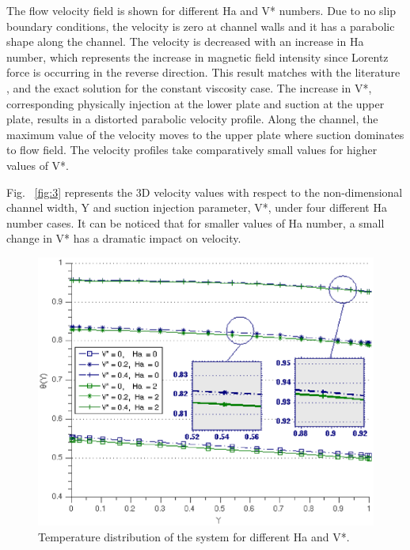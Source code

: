 The flow velocity field is shown for different Ha and V* numbers. Due to no slip boundary conditions, the velocity is zero at channel walls and it has a parabolic shape along the channel. The velocity is decreased with an increase in Ha number, which represents the increase in magnetic field intensity since Lorentz force is occurring in the reverse direction.  This result matches with the literature \cite{EegunjobiEntropy}, and the exact solution for the constant viscosity case. The increase in V*, corresponding physically injection at the lower plate and suction at the upper plate, results in a distorted parabolic velocity profile. Along the channel, the maximum value of the velocity moves to the upper plate where suction dominates to flow field. The velocity profiles take comparatively small values for higher values of V*. 

Fig. ~\ref{fig:3} represents the 3D velocity values with respect to the non-dimensional channel width, Y and suction injection parameter, V*, under four different Ha number cases. It can be noticed that for smaller values of Ha number, a small change in V* has a dramatic impact on velocity.

\begin{figure}[H]
  \includegraphics[scale=0.7]{figures/fig5.eps}
\vspace*{6mm}
\caption{Temperature distribution of the system for different Ha and V*.}
\label{fig:5}       %
\end{figure}  

